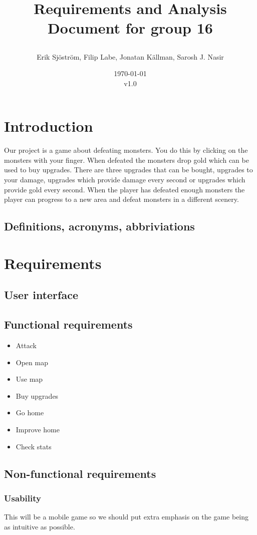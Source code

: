 \documentclass{article}
\title{
    Requirements and Analysis Document for group 16
    \author{Erik Sjöström,
            Filip Labe,
            Jonatan Källman,
            Sarosh J. Nasir}
    \date{\today \\v1.0}         
}
\begin{document}
\maketitle

\section{Introduction}
Our project is a game about defeating monsters. You do this by clicking 
on the monsters with your finger. When defeated the monsters drop gold 
which can be used to buy upgrades. There are three upgrades that can be 
bought, upgrades to your damage, upgrades which provide damage every second 
or upgrades which provide gold every second. When the player has defeated enough 
monsters the player can progress to a new area and defeat monsters in a different 
scenery. 

\subsection{Definitions, acronyms, abbriviations}

\section{Requirements}
\subsection{User interface}
\subsection{Functional requirements}
\begin{itemize}
    \item Attack
    \item Open map
    \item Use map
    \item Buy upgrades
    \item Go home
    \item Improve home
    \item Check stats
\end{itemize}
\subsection{Non-functional requirements}
\subsubsection{Usability}
This will be a mobile game so we should put extra emphasis on the game being as
intuitive as possible.
\end{document}
